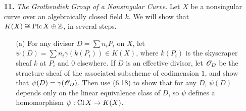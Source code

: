 \documentclass{article}
\begin{document}
\begin{enumerate} [label=\textbf{\arabic*.}, leftmargin=0em]
\begin{itemize}
    \item[(b)] If $X$ is any integral scheme, and $\fF$ a coherent sheaf, we define the \textit{rank} of $\fF$ to be $\dim_K{\fF_\xi}$, where $\xi$ is the generic point of $X$, and $K = \fO_{\xi}$ is the function field of $X$. Show that the rank function defines a surjective homomorphism $\rk : K(X) \to \Z$.

    \item[(c)] If $Y$ is a closed subcheme of $X$, there is an exact sequence
    \[\begin{tikzcd}
        K(Y) \arrow[r] & K(X) \arrow[r] & K(X - Y) \arrow[r] & 0,
        \end{tikzcd} \]
    where the first map is extension by zero, and the second map is restriction.
\end{itemize}

\begin{proof} $ $ \vspace{0pt}
\begin{itemize} [leftmargin=0cm]
\item[(a)] Suppose $X = \spec{A}$ for some principle ideal domain $A$. Coherent sheaves on $X$ correspond to finitely generated $A$-modules. Any such module can be decomposed as a direct sum of a free and torsion submodule. Any torsion module is a direct sum of $A / \goth{p}$, where $\goth{p}$ is a prime ideal of $A$. Since $A$ is a principle ideal domain, all prime ideals are rank one $A$-modules, so $\gamma(A) = \gamma(\goth{p})$. We have the exact sequence
\begin{equation*}
    0 \to \goth{p} \to A \to A / \goth{p} \to 0,
\end{equation*}
which implies $\gamma(A / \goth{p}) = 0$. Hence, we can identify elements of $K(X)$ to the rank of their free parts.

\item[(b)] Take $\fF = \fO_X^{\oplus n}$ for each $n$, then $\rk \fF = n$.

\end{itemize}
\end{proof}

\item[\textbf{11.}] \textit{The Grothendiek Group of a Nonsingular Curve.} Let $X$ be a nonsingular curve over an algebraically closed field $k$. We will show that $K(X) \cong \operatorname{Pic} X \oplus \mathbb{Z}$, in several steps.
\begin{itemize}
    \item[(a)] For any divisor $D = \sum n_i P_i$ on $X$, let $\psi(D) = \sum n_i \gamma(k(P_i)) \in K(X)$, where $k(P_i)$ is the skyscraper sheaf $k$ at $P_i$ and $0$ elsewhere. If $D$ is an effective divisor, let $\mathscr{O}_D$ be the structure sheaf of the associated subscheme of codimension $1$, and show that $\psi(D) = \gamma(\mathscr{O}_D)$. Then use (6.18) to show that for any $D$, $\psi(D)$ depends only on the linear equivalence class of $D$, so $\psi$ defines a homomorphism $\psi : \operatorname{Cl} X \to K(X)$.


\end{itemize}
\end{enumerate}
\end{document}
